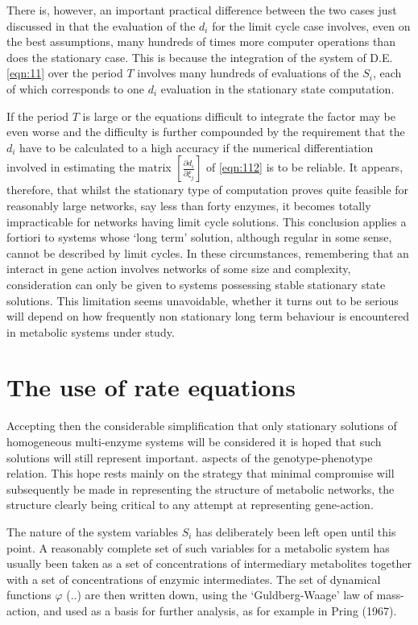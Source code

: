 There is, however, an important practical difference between the two cases just discussed in that the evaluation of the $d_i$ for the limit cycle case involves, even on the best assumptions, many hundreds of times more computer operations than does the stationary case. This is because the integration of the system of D.E. \eqref{eqn:11} over the period $T$ involves many hundreds of evaluations of the $S_i$, each of which corresponds to one $d_i$ evaluation in the stationary state computation.

If the period $T$ is large or the equations difficult to integrate the factor may be even worse and the difficulty is further compounded by the requirement that the $d_i$ have to be calculated to a high accuracy if the numerical differentiation involved in estimating the matrix $\left[\frac{\partial d_i}{\partial \xi_j}\right]$ of \eqref{eqn:112} is to be reliable. It appears, therefore, that whilst the stationary type of computation proves quite feasible for reasonably large networks, say less than forty enzymes, it becomes totally impracticable for networks having limit cycle solutions. This conclusion applies a fortiori to systems whose `long term' solution, although regular in some sense, cannot be described by limit cycles. In these circumstances, remembering that an interact in gene action involves networks of some size and complexity, consideration can only be given to systems possessing stable stationary state solutions. This limitation seems unavoidable, whether it turns out to be serious will depend on how frequently non stationary long term behaviour is encountered in metabolic systems under study.

\section{The use of rate equations}

Accepting then the considerable simplification that only stationary solutions of homogeneous multi-enzyme systems will be considered it is hoped that such solutions will still represent important. aspects of the genotype-phenotype relation. This hope rests mainly on the strategy that minimal compromise will subsequently be made in representing the structure of metabolic networks, the structure clearly being critical to any attempt at representing gene-action.

The nature of the system variables $S_{i}$ has deliberately been left open until this point. A reasonably complete set of such variables for a metabolic system has usually been taken as a set of concentrations of intermediary metabolites together with a set of concentrations of enzymic intermediates. The set of dynamical functions $\varphi$ (..) are then written down, using the `Guldberg-Waage' law of mass-action, and used as a basis for further analysis, as for example in Pring (1967).

